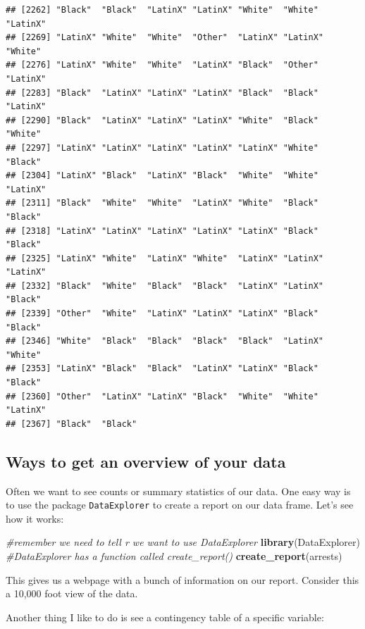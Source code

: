 \documentclass[]{book}
\newenvironment{Shaded}{\begin{snugshade}}{\end{snugshade}}
\newcommand{\CommentTok}[1]{\textcolor[rgb]{0.56,0.35,0.01}{\textit{#1}}}
\newcommand{\KeywordTok}[1]{\textcolor[rgb]{0.13,0.29,0.53}{\textbf{#1}}}
\newcommand{\NormalTok}[1]{#1}
\newcommand{\OperatorTok}[1]{\textcolor[rgb]{0.81,0.36,0.00}{\textbf{#1}}}
\begin{document}
\begin{verbatim}
## [2262] "Black"  "Black"  "LatinX" "LatinX" "White"  "White"  "LatinX"
## [2269] "LatinX" "White"  "White"  "Other"  "LatinX" "LatinX" "White" 
## [2276] "LatinX" "White"  "White"  "LatinX" "Black"  "Other"  "LatinX"
## [2283] "Black"  "LatinX" "LatinX" "LatinX" "Black"  "Black"  "LatinX"
## [2290] "Black"  "LatinX" "LatinX" "LatinX" "White"  "Black"  "White" 
## [2297] "LatinX" "LatinX" "LatinX" "LatinX" "LatinX" "White"  "Black" 
## [2304] "LatinX" "Black"  "LatinX" "Black"  "White"  "White"  "LatinX"
## [2311] "Black"  "White"  "White"  "LatinX" "White"  "Black"  "Black" 
## [2318] "LatinX" "LatinX" "LatinX" "LatinX" "LatinX" "Black"  "Black" 
## [2325] "LatinX" "White"  "LatinX" "White"  "LatinX" "LatinX" "LatinX"
## [2332] "Black"  "White"  "Black"  "Black"  "LatinX" "LatinX" "Black" 
## [2339] "Other"  "White"  "LatinX" "LatinX" "LatinX" "Black"  "Black" 
## [2346] "White"  "Black"  "Black"  "Black"  "Black"  "LatinX" "White" 
## [2353] "LatinX" "Black"  "Black"  "LatinX" "LatinX" "Black"  "Black" 
## [2360] "Other"  "LatinX" "LatinX" "Black"  "White"  "White"  "LatinX"
## [2367] "Black"  "Black"
\end{verbatim}

\hypertarget{ways-to-get-an-overview-of-your-data}{%
\subsection{Ways to get an overview of your data}\label{ways-to-get-an-overview-of-your-data}}

Often we want to see counts or summary statistics of our data. One easy way is to use the package \texttt{DataExplorer} to create a report on our data frame. Let's see how it works:

\begin{Shaded}
\begin{Highlighting}[]
\CommentTok{#remember we need to tell r we want to use DataExplorer}
\KeywordTok{library}\NormalTok{(DataExplorer)}
\CommentTok{#DataExplorer has a function called create_report()}
\KeywordTok{create_report}\NormalTok{(arrests)}
\end{Highlighting}
\end{Shaded}

This gives us a webpage with a bunch of information on our report. Consider this a 10,000 foot view of the data.

Another thing I like to do is see a contingency table of a specific variable:

\begin{Shaded}
\end{Shaded}
\end{document}

